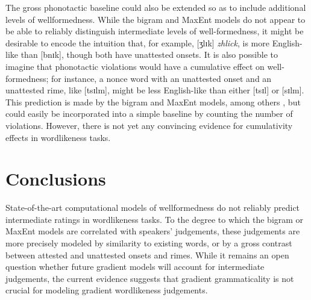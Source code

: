 The gross phonotactic baseline could also be extended so as to include additional levels of wellformedness. While the bigram and MaxEnt models do not appear to be able to reliably distinguish intermediate levels of well-formedness, it might be desirable to encode the intuition that, for example, [ʒlɪk] \emph{zhlick}, is more English-like than [bnɪk], though both have unattested onsets. It is also possible to imagine that phonotactic violations would have a cumulative effect on well-formedness; for instance, a nonce word with an unattested onset and an unattested rime, like [tsɪlm], might be less English-like than either [tsɪl] or [sɪlm]. This prediction is made by the bigram and MaxEnt models, among others \citep[e.g.,][]{Albright2008,Anttila1997}, but could easily be incorporated into a simple baseline by counting the number of violations. However, there is not yet any convincing evidence for cumulativity effects in wordlikeness tasks.

\section{Conclusions}

State-of-the-art computational models of wellformedness do not reliably predict intermediate ratings in wordlikeness tasks. To the degree to which the bigram or MaxEnt models are correlated with speakers' judgements, these judgements are more precisely modeled by similarity to existing words, or by a gross contrast between attested and unattested onsets and rimes. 
While it remains an open question whether future gradient models will account for intermediate judgements, the current evidence suggests that gradient grammaticality is not crucial for modeling gradient wordlikeness judgements.


